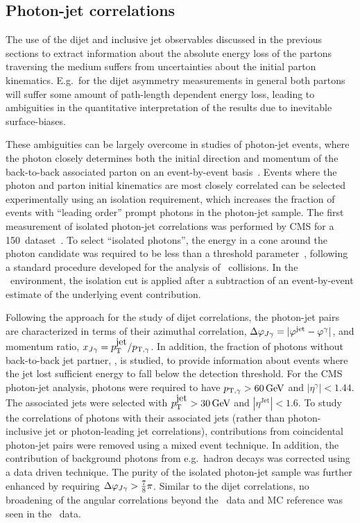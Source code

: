 \subsection{Photon-jet correlations}

The use of the dijet and inclusive jet observables discussed in the previous sections
to extract information about the absolute energy loss of the partons traversing the medium suffers from
uncertainties about the initial parton kinematics. E.g.\ for the dijet asymmetry
measurements in general both partons will suffer some amount of path-length dependent
energy loss, leading to ambiguities in the quantitative interpretation of the results
due to inevitable surface-biases.

These ambiguities can be largely overcome in studies of photon-jet events,
where the photon closely determines both the initial direction and momentum 
of the back-to-back associated parton on an event-by-event basis~\cite{Wang:1996yh}.
Events where the photon and parton initial kinematics are most closely correlated
can be selected experimentally using an isolation requirement, which
increases the fraction of events with ``leading order'' prompt photons in
the photon-jet sample. The first measurement of isolated photon-jet correlations
was performed by CMS for a 150\mubinv \PbPb\ dataset~\cite{Chatrchyan:2012gt}.
To select ``isolated photons'', the energy in a cone around 
the photon candidate was required to be less than a threshold parameter~\cite{HIPhoton},
following a standard procedure developed for the analysis of \pp\ collisions. In the \PbPb\ 
environment, the isolation cut is applied after a subtraction of an event-by-event 
estimate of the underlying event contribution.

Following the approach for the study of dijet correlations, the photon-jet pairs
are characterized in terms of their azimuthal correlation, $\Delta\varphi_{J\gamma} = |\varphi^\mathrm{jet} - \varphi^{\gamma}|$,
 and momentum ratio, $x_{J\gamma} = p_{\mathrm{T}}^{\mbox{jet}}/p_{\mathrm{T},\gamma}$. In addition, the fraction of photons without
back-to-back jet partner,  \rjg, is studied, to provide information about
events where the jet lost sufficient energy to fall below the detection threshold.
For the CMS photon-jet analysis, photons were required to have $p_{\mathrm{T},\gamma} > 60\,\mathrm{GeV}$
and  $|\eta^\gamma|<1.44$. The associated jets were selected with
$p_{\mathrm{T}}^{\mbox{jet}} > 30\,\mathrm{GeV}$ and $|\eta^{\mbox{Jet}}|<1.6$. To study the correlations of
photons with their associated jets (rather than photon-inclusive jet or photon-leading
jet correlations), contributions from
coincidental photon-jet pairs were removed using a mixed event technique. In
addition, the contribution of background photons from e.g.\ hadron decays
was corrected using a data driven technique. The purity of the isolated photon-jet
sample was further enhanced by requiring $\Delta\varphi_{J\gamma} > \frac{7}{8}\pi$.
Similar to the dijet correlations, no broadening of the angular correlations
beyond the \pp\ data and MC reference was seen in the \PbPb\ data.

